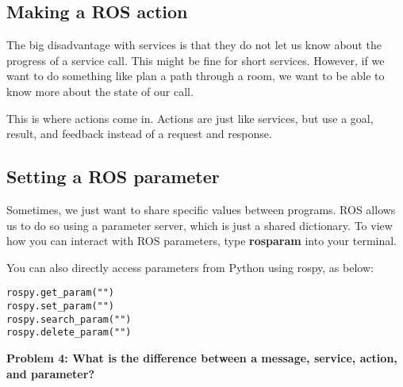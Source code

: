 \subsection{Making a ROS action}
The big disadvantage with services is that they do not let us know about the progress of a service call. This might be fine for short services. However, if we want to do something like plan a path through a room, we want to be able to know more about the state of our call. 

This is where actions come in. Actions are just like services, but use a goal, result, and feedback instead of a request and response. 

\subsection{Setting a ROS parameter}
Sometimes, we just want to share specific values between programs. ROS allows us to do so using a parameter server, which is just a shared dictionary. To view how you can interact with ROS parameters, type \textbf{rosparam} into your terminal.

You can also directly access parameters from Python using rospy, as below:

\begin{tcolorbox}
\begin{lstlisting}
rospy.get_param("")
rospy.set_param("")
rospy.search_param("")
rospy.delete_param("")
\end{lstlisting}
\end{tcolorbox}

 \textbf{Problem 4: What is the difference between a message, service, action, and parameter?}

